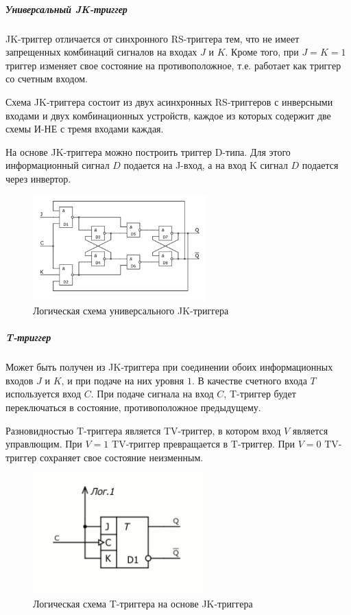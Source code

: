 \documentclass{article}
\begin{document}
\begin{flushleft}
\pagebreak
\subparagraph{Универсальный JK-триггер}

JK-триггер отличается от синхронного RS-триггера тем, что не имеет запрещенных комбинаций сигналов на входах $J$ и $K$. Кроме того, при $J = K = 1$ триггер изменяет свое состояние на противоположное, т.е. работает как триггер со счетным входом.

Схема JK-триггера состоит из двух асинхронных RS-триггеров с инверсными входами и двух комбинационных устройств, каждое из которых содержит две схемы И-НЕ с тремя входами каждая.

На основе JK-триггера можно построить триггер D-типа. Для этого информационный сигнал $D$ подается на J-вход, а на вход K сигнал $D$ подается через инвертор.

\begin{figure}
\caption{Логическая схема универсального JK-триггера}
\includegraphics[width=0.6\textwidth]{assets/jk_trigger.png}
\end{figure}

\subparagraph{T-триггер}

Может быть получен из JK-триггера при соединении обоих информационных входов $J$ и $K$, и при подаче на них уровня $1$. В качестве счетного входа $T$ используется вход $C$. При подаче сигнала на вход $C$, T-триггер будет переключаться в состояние, противоположное предыдущему.

Разновидностью T-триггера является TV-триггер, в котором вход $V$ является управлющим. При $V = 1$ TV-триггер превращается в T-триггер. При $V = 0$ TV-триггер сохраняет свое состояние неизменным.

\begin{figure}
\caption{Логическая схема T-триггера на основе JK-триггера}
\includegraphics[width=0.6\textwidth]{assets/t_trigger.png}
\end{figure}


\end{flushleft}
\end{document}

